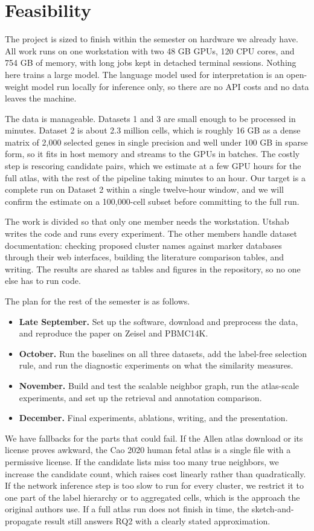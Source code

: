 \section{Feasibility}
The project is sized to finish within the semester on hardware we already have. All work runs on one workstation with two 48 GB GPUs, 120 CPU cores, and 754 GB of memory, with long jobs kept in detached terminal sessions. Nothing here trains a large model. The language model used for interpretation is an open-weight model run locally for inference only, so there are no API costs and no data leaves the machine.

The data is manageable. Datasets 1 and 3 are small enough to be processed in minutes. Dataset 2 is about 2.3 million cells, which is roughly 16 GB as a dense matrix of 2,000 selected genes in single precision and well under 100 GB in sparse form, so it fits in host memory and streams to the GPUs in batches. The costly step is rescoring candidate pairs, which we estimate at a few GPU hours for the full atlas, with the rest of the pipeline taking minutes to an hour. Our target is a complete run on Dataset 2 within a single twelve-hour window, and we will confirm the estimate on a 100,000-cell subset before committing to the full run.

The work is divided so that only one member needs the workstation. Utshab writes the code and runs every experiment. The other members handle dataset documentation: checking proposed cluster names against marker databases through their web interfaces, building the literature comparison tables, and writing. The results are shared as tables and figures in the repository, so no one else has to run code.

The plan for the rest of the semester is as follows.
\begin{itemize}
\item \textbf{Late September.} Set up the software, download and preprocess the data, and reproduce the paper on Zeisel and PBMC14K.
\item \textbf{October.} Run the baselines on all three datasets, add the label-free selection rule, and run the diagnostic experiments on what the similarity measures.
\item \textbf{November.} Build and test the scalable neighbor graph, run the atlas-scale experiments, and set up the retrieval and annotation comparison.
\item \textbf{December.} Final experiments, ablations, writing, and the presentation.
\end{itemize}

We have fallbacks for the parts that could fail. If the Allen atlas download or its license proves awkward, the Cao 2020 human fetal atlas is a single file with a permissive license. If the candidate lists miss too many true neighbors, we increase the candidate count, which raises cost linearly rather than quadratically. If the network inference step is too slow to run for every cluster, we restrict it to one part of the label hierarchy or to aggregated cells, which is the approach the original authors use. If a full atlas run does not finish in time, the sketch-and-propagate result still answers RQ2 with a clearly stated approximation.
